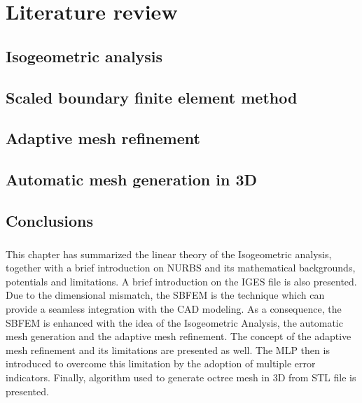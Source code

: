 
\chapter{Literature review}
% 

\section{Isogeometric analysis}
\label{lr_sec:iso_analysis}




\section{Scaled boundary finite element method}
\label{lr_sec:sbfem}


\section{Adaptive mesh refinement}



\section{Automatic mesh generation in 3D}


\section{Conclusions}
\paragraph{}
This chapter has summarized the linear theory of the Isogeometric analysis, together with a brief introduction on NURBS and its mathematical backgrounds, potentials and limitations.
A brief introduction on the IGES file is also presented.
Due to the dimensional mismatch, the SBFEM is the technique which can provide a seamless integration with the CAD modeling.
As a consequence, the SBFEM is enhanced with the idea of the Isogeometric Analysis, the automatic mesh generation and the adaptive mesh refinement.
The concept of the adaptive mesh refinement and its limitations are presented as well.
The MLP then is introduced to overcome this limitation by the adoption of multiple error indicators.
Finally, algorithm used to generate octree mesh in 3D from STL file is presented.
